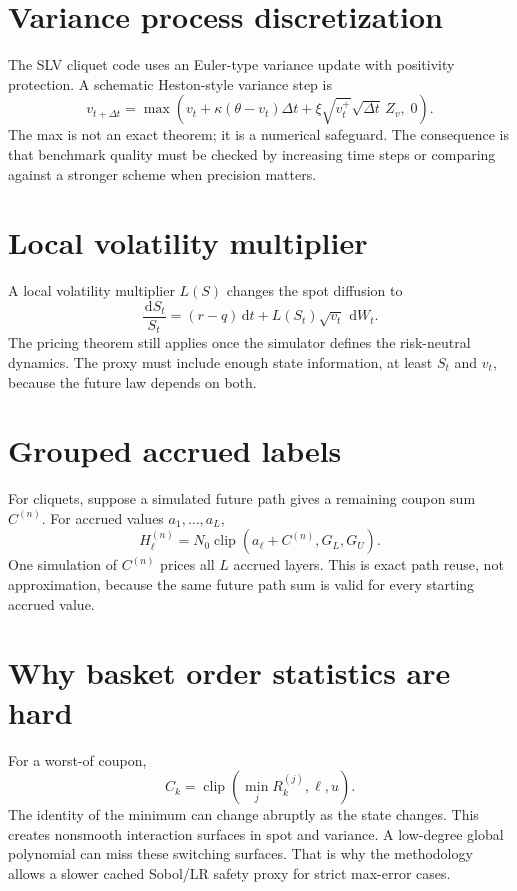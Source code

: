 \documentclass[11pt,oneside]{book}
\theoremstyle{definition}
\newcommand{\dd}{\,\mathrm{d}}
\newcommand{\clip}{\operatorname{clip}}
\begin{document}
\section{Variance process discretization}
The SLV cliquet code uses an Euler-type variance update with positivity protection. A schematic Heston-style variance step is
\[
  v_{t+\Delta t}
  =
  \max\!\left(
  v_t+\kappa(\theta-v_t)\Delta t+\xi\sqrt{v_t^+}\sqrt{\Delta t}\,Z_v,\;0
  \right).
\]
The max is not an exact theorem; it is a numerical safeguard. The consequence is that benchmark quality must be checked by increasing time steps or comparing against a stronger scheme when precision matters.

\section{Local volatility multiplier}
A local volatility multiplier \(L(S)\) changes the spot diffusion to
\[
  \frac{\dd S_t}{S_t}
  =
  (r-q)\dd t+L(S_t)\sqrt{v_t}\,\dd W_t.
\]
The pricing theorem still applies once the simulator defines the risk-neutral dynamics. The proxy must include enough state information, at least \(S_t\) and \(v_t\), because the future law depends on both.

\section{Grouped accrued labels}
For cliquets, suppose a simulated future path gives a remaining coupon sum \(C^{(n)}\). For accrued values \(a_1,\ldots,a_L\),
\[
  H_\ell^{(n)}
  =
  N_0\clip(a_\ell+C^{(n)},G_L,G_U).
\]
One simulation of \(C^{(n)}\) prices all \(L\) accrued layers. This is exact path reuse, not approximation, because the same future path sum is valid for every starting accrued value.

\section{Why basket order statistics are hard}
For a worst-of coupon,
\[
  C_k=\clip(\min_j R_k^{(j)},\ell,u).
\]
The identity of the minimum can change abruptly as the state changes. This creates nonsmooth interaction surfaces in spot and variance. A low-degree global polynomial can miss these switching surfaces. That is why the methodology allows a slower cached Sobol/LR safety proxy for strict max-error cases.

\backmatter
\end{document}
